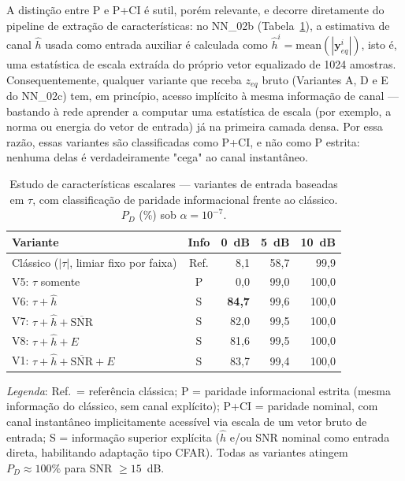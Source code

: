 \documentclass[12pt,a4paper]{article}
\begin{document}
A distinção entre P e P+CI é sutil, porém relevante, e decorre diretamente do pipeline de extração de características: no NN\_02b (Tabela~\ref{tab:tau_ablation}), a estimativa de canal $\hat{h}$ usada como entrada auxiliar é calculada como $\hat{h}^i = \mathrm{mean}(|\mathbf{y}_{eq}^i|)$, isto é, uma estatística de escala extraída do próprio vetor equalizado de 1024 amostras. Consequentemente, qualquer variante que receba $z_{eq}$ bruto (Variantes A, D e E do NN\_02c) tem, em princípio, acesso implícito à mesma informação de canal --- bastando à rede aprender a computar uma estatística de escala (por exemplo, a norma ou energia do vetor de entrada) já na primeira camada densa. Por essa razão, essas variantes são classificadas como P+CI, e não como P estrita: nenhuma delas é verdadeiramente "cega" ao canal instantâneo.

\begin{table}[htb]
\caption{\label{tab:tau_ablation}Estudo de características escalares --- variantes de entrada baseadas em $\tau$, com classificação de paridade informacional frente ao clássico. $P_D$ (\%) sob $\alpha=10^{-7}$.}
\begin{center}
{\footnotesize
\begin{tabular}{lcrrr}\toprule
Variante & Info & 0~dB & 5~dB & 10~dB \\\midrule
Clássico ($|\tau|$, limiar fixo por faixa) & Ref. & 8{,}1 & 58{,}7 & 99{,}9 \\\midrule
V5: $\tau$ somente             & P & 0{,}0  & 99{,}0 & 100{,}0 \\
V6: $\tau + \hat h$            & S & \textbf{84{,}7} & 99{,}6 & 100{,}0 \\
V7: $\tau + \hat h + \overline{\text{SNR}}$ & S & 82{,}0 & 99{,}5 & 100{,}0 \\
V8: $\tau + \hat h + E$        & S & 81{,}6 & 99{,}5 & 100{,}0 \\
V1: $\tau + \hat h + \overline{\text{SNR}} + E$ & S & 83{,}7 & 99{,}4 & 100{,}0 \\
\bottomrule
\end{tabular}
}
\end{center}
\footnotesize\textit{Legenda}: Ref.\ = referência clássica; P = paridade informacional estrita (mesma informação do clássico, sem canal explícito); P+CI = paridade nominal, com canal instantâneo implicitamente acessível via escala de um vetor bruto de entrada; S = informação superior explícita ($\hat h$ e/ou SNR nominal como entrada direta, habilitando adaptação tipo CFAR). Todas as variantes atingem $P_D \approx 100\%$ para SNR $\geq 15$~dB.
\end{table}
\end{document}
